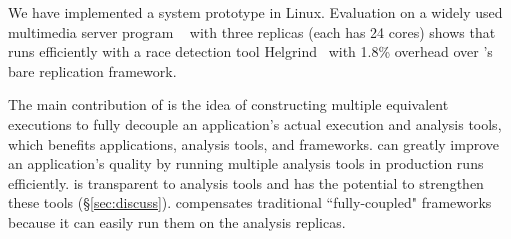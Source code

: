 We have implemented a \xxx system prototype in Linux. Evaluation on a widely 
used multimedia server program \mediatomb~\cite{mediatomb} with three replicas
(each has 24 cores) shows that \xxx runs efficiently with a race detection tool 
Helgrind~\cite{valgrind:pldi} with 1.8\% overhead over \xxx's bare replication 
framework.


The main contribution of \xxx is the idea of constructing multiple equivalent
executions to fully decouple an application's actual execution and analysis
tools, which benefits applications, analysis tools, and frameworks. \xxx can
greatly improve an application's quality by running multiple analysis tools in
production runs efficiently. \xxx is transparent to analysis tools and has the
potential to strengthen these tools (\S\ref{sec:discuss}). \xxx compensates
traditional ``fully-coupled" frameworks because it can easily run them on the
analysis replicas.


















